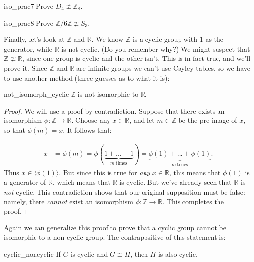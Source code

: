 \begin{exercise}{iso_prac7}
Prove $D_4 \ncong {\mathbb Z}_8$.
\end{exercise}

\begin{exercise}{iso_prac8}
Prove  ${\mathbb Z}/ 6 {\mathbb Z} \ncong S_3$.
\end{exercise}


Finally, let's look at ${\mathbb Z}$ and ${\mathbb R}$.  We know ${\mathbb Z}$ is a cyclic group with $1$ as the generator, while ${\mathbb R}$ is not cyclic. (Do you remember why?)  We might suspect  that  ${\mathbb Z} \ncong {\mathbb R}$, since one group is cyclic and the other isn't.  This is in fact true, and we'll prove it.   Since ${\mathbb Z}$ and ${\mathbb R}$ are infinite groups we can't use Cayley tables, so we have to use another method (three guesses as to what it is):

\begin{prop}{not_isomorph_cyclic}
${\mathbb Z}$ is not isomorphic to ${\mathbb R}$.
\end{prop}
\begin{proof}
We will use a proof by contradiction.   Suppose that there exists an isomorphism $\phi: {\mathbb Z} \rightarrow {\mathbb R}$.  Choose any $x \in {\mathbb R}$, and let $m \in {\mathbb Z}$ be the pre-image of $x$, so that $\phi(m) = x$.  It follows that: 

\begin{align*}
x &= \phi(m) = \phi(\underbrace{1 + \ldots + 1}_{m~\textrm{times}})= \underbrace{\phi(1) + \ldots + \phi(1)}_{m~\textrm{times}}.
\end{align*}
Thus $x \in \langle  \phi(1) \rangle$.  But since this is true for \emph{any} $x \in {\mathbb R}$, this means that  $\phi(1)$ is a generator of  ${\mathbb R}$, which means that ${\mathbb R}$ is cyclic. But we've already seen that 
${\mathbb R}$ is \emph{not} cyclic. This contradiction shows that our original supposition must be false: namely, there \emph{cannot} exist an isomorphism $\phi: {\mathbb Z} \rightarrow {\mathbb R}$. This completes the proof.
\end{proof}

\noindent
Again we can generalize this proof to prove that a cyclic group cannot be isomorphic to a non-cyclic group. The contrapositive of this statement is:

\begin{prop}{cyclic_noncyclic}
If $G$ is cyclic and $G \cong H$, then $H$ is also cyclic.
\end{prop}


